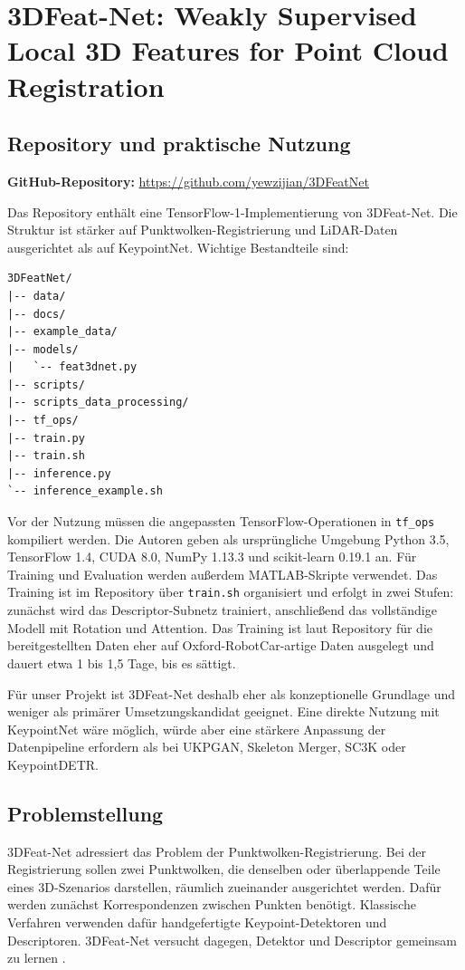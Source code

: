 \documentclass[11pt,a4paper]{article}
\begin{document}
\section{3DFeat-Net: Weakly Supervised Local 3D Features for Point Cloud Registration}

\subsection{Repository und praktische Nutzung}

\textbf{GitHub-Repository:} \url{https://github.com/yewzijian/3DFeatNet}

Das Repository enthält eine TensorFlow-1-Implementierung von 3DFeat-Net. Die Struktur ist stärker auf Punktwolken-Registrierung und LiDAR-Daten ausgerichtet als auf KeypointNet. Wichtige Bestandteile sind:

\begin{lstlisting}
3DFeatNet/
|-- data/
|-- docs/
|-- example_data/
|-- models/
|   `-- feat3dnet.py
|-- scripts/
|-- scripts_data_processing/
|-- tf_ops/
|-- train.py
|-- train.sh
|-- inference.py
`-- inference_example.sh
\end{lstlisting}

Vor der Nutzung müssen die angepassten TensorFlow-Operationen in \texttt{tf\_ops} kompiliert werden. Die Autoren geben als ursprüngliche Umgebung Python 3.5, TensorFlow 1.4, CUDA 8.0, NumPy 1.13.3 und scikit-learn 0.19.1 an. Für Training und Evaluation werden außerdem MATLAB-Skripte verwendet. Das Training ist im Repository über \texttt{train.sh} organisiert und erfolgt in zwei Stufen: zunächst wird das Descriptor-Subnetz trainiert, anschließend das vollständige Modell mit Rotation und Attention. Das Training ist laut Repository für die bereitgestellten Daten eher auf Oxford-RobotCar-artige Daten ausgelegt und dauert etwa 1 bis 1,5 Tage, bis es sättigt.

Für unser Projekt ist 3DFeat-Net deshalb eher als konzeptionelle Grundlage und weniger als primärer Umsetzungskandidat geeignet. Eine direkte Nutzung mit KeypointNet wäre möglich, würde aber eine stärkere Anpassung der Datenpipeline erfordern als bei UKPGAN, Skeleton Merger, SC3K oder KeypointDETR.

\subsection{Problemstellung}

3DFeat-Net adressiert das Problem der Punktwolken-Registrierung. Bei der Registrierung sollen zwei Punktwolken, die denselben oder überlappende Teile eines 3D-Szenarios darstellen, räumlich zueinander ausgerichtet werden. Dafür werden zunächst Korrespondenzen zwischen Punkten benötigt. Klassische Verfahren verwenden dafür handgefertigte Keypoint-Detektoren und Descriptoren. 3DFeat-Net versucht dagegen, Detektor und Descriptor gemeinsam zu lernen \cite{yew2018_3dfeatnet}.
\end{document}
